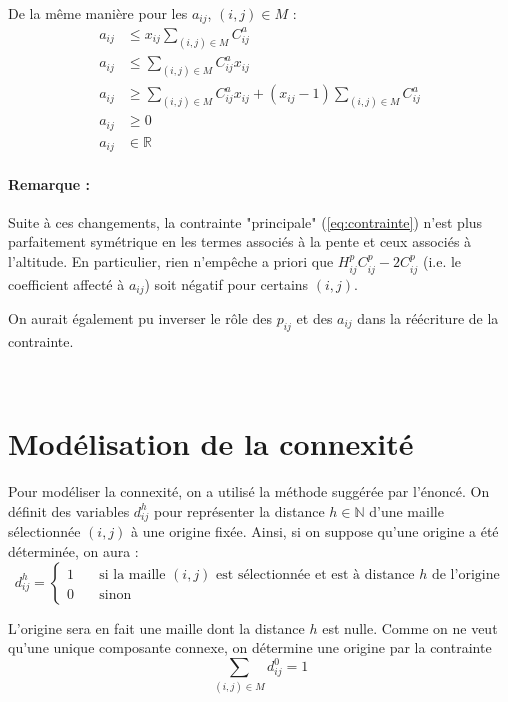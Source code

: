 \documentclass[a4paper,11pt]{article}
\begin{document}
De la même manière pour les $a_{ij}$, $(i,j) \in M$ :
\begin{align}
a_{ij} & \le x_{ij} \sum_{(i,j)\in M} C^a_{ij} \\
a_{ij} & \le \sum_{(i,j)\in M} C^a_{ij} x_{ij} \\
a_{ij} & \ge \sum_{(i,j)\in M} C^a_{ij} x_{ij} + (x_{ij}-1) \sum_{(i,j)\in M} C^a_{ij} \\
a_{ij} & \ge 0 \\
a_{ij} & \in \mathbb{R}
\end{align}


\paragraph{Remarque :} Suite à ces changements, la contrainte "principale" (\ref{eq:contrainte}) n'est plus parfaitement symétrique en les termes associés à la pente et ceux associés à l'altitude. En particulier, rien n'empêche a priori que $H^p_{ij} C^p_{ij} - 2 C^p_{ij}$ (i.e. le coefficient affecté à $a_{ij}$) soit négatif pour certains $(i,j)$.

On aurait également pu inverser le rôle des $p_{ij}$ et des $a_{ij}$ dans la réécriture de la contrainte.












~\\
\section{Modélisation de la connexité}

Pour modéliser la connexité, on a utilisé la méthode suggérée par l'énoncé. On définit des variables $d^h_{ij}$ pour représenter la distance $h \in \mathbb{N}$ d'une maille sélectionnée $(i,j)$ à une origine fixée. Ainsi, si on suppose qu'une origine a été déterminée, on aura :
\begin{equation*}
d^h_{ij} = \left\{
\begin{array}{cl}
1 & \quad \text{si la maille } (i,j) \text{ est sélectionnée et est à distance $h$ de l'origine} \\ 
0 & \quad \text{sinon}
\end{array} \right.
\end{equation*}


L'origine sera en fait une maille dont la distance $h$ est nulle. Comme on ne veut qu'une unique composante connexe, on détermine une origine par la contrainte 
\begin{equation}
\sum_{(i,j)\in M} d^0_{ij} = 1
\end{equation}
\end{document}
